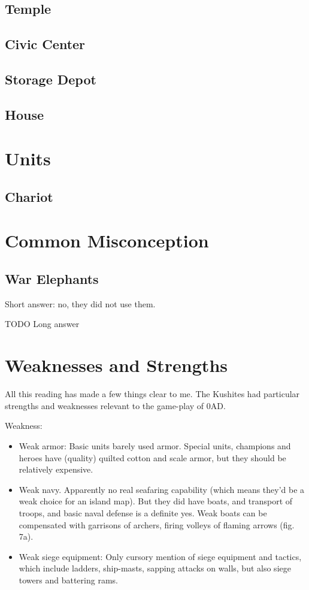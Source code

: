 \documentclass[a4paper,12pt]{scrreprt}
\begin{document}
\subsection{Temple}

\subsection{Civic Center}

\subsection{Storage Depot}

\subsection{House}

\section{Units}

\subsection{Chariot}

\section{Common Misconception}

\subsection{War Elephants}

Short answer: no, they did not use them.

TODO Long answer

\section{Weaknesses and Strengths}

All this reading has made a few things clear to me. The Kushites had particular strengths and weaknesses relevant to the game-play of 0AD.

Weakness:

\begin{itemize}
	\item Weak armor: Basic units barely used armor. Special units, champions and heroes have (quality) quilted cotton and scale armor, but they should be relatively expensive.
	\item Weak navy. Apparently no real seafaring capability (which means they’d be a weak choice for an island map). But they did have boats, and transport of troops, and basic naval defense is a definite yes. Weak boats can be compensated with garrisons of archers, firing volleys of flaming arrows (fig. 7a).
	\item Weak siege equipment: Only cursory mention of siege equipment and tactics, which include ladders, ship-masts, sapping attacks on walls, but also siege towers and battering rams.
\end{itemize}
\end{document}
